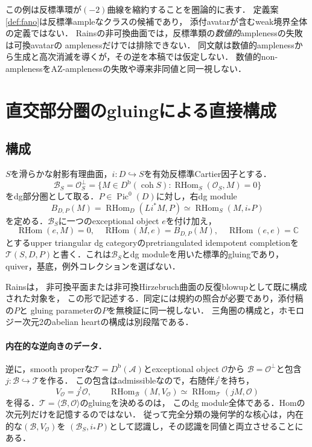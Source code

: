 \documentclass[11pt,a4paper]{ltjsarticle}
\theoremstyle{definition}
\newcommand{\OO}{\mathcal O}
\renewcommand{\AA}{\mathcal A}
\newcommand{\BB}{\mathcal B}
\newcommand{\TT}{\mathcal T}
\newcommand{\Db}{D^{\mathrm b}}
\newcommand{\RHom}{\operatorname{RHom}}
\newcommand{\coh}{\operatorname{coh}}
\newcommand{\Pic}{\operatorname{Pic}}
\begin{document}
この例は反標準環が$(-2)$曲線を縮約することを圏論的に表す．
定義案\ref{def:fano}は反標準ampleなクラスの候補であり，
添付avatarが含むweak境界全体の定義ではない．
Rainsの非可換曲面では，反標準類の\emph{数値的}amplenessの失敗は可換avatarの
amplenessだけでは排除できない\cite[\S4]{RainsFiltered}．
同文献は数値的amplenessから生成と高次消滅を導くが，その逆を本稿では仮定しない．
数値的non-amplenessをAZ-amplenessの失敗や導来非同値と同一視しない．

\section{直交部分圏のgluingによる直接構成}
\subsection{構成}
$S$を滑らかな射影有理曲面，$i:D\hookrightarrow S$を有効反標準Cartier因子とする．
\begin{equation}\label{eq:residual}
 \BB_S=\OO_S^\perp
 =\{M\in\Db(\coh S):\RHom_S(\OO_S,M)=0\}
\end{equation}
をdg部分圏として取る．$P\in\Pic^0(D)$に対し，右dg module
\begin{equation}\label{eq:glue-module}
 B_{D,P}(M)=\RHom_D(Li^*M,P)
 \simeq\RHom_S(M,i_*P)
\end{equation}
を定める．$\BB_S$に一つのexceptional object $e$を付け加え，
\begin{equation}\label{eq:glue-category}
 \RHom(e,M)=0,\quad
 \RHom(M,e)=B_{D,P}(M),\quad
 \RHom(e,e)=\mathbb C
\end{equation}
とするupper triangular dg categoryのpretriangulated idempotent completionを
$\TT(S,D,P)$と書く．これは$\BB_S$とdg moduleを用いた標準的gluingであり，
quiver，基底，例外コレクションを選ばない．

Rains\cite[Theorem 4.30]{RainsBirational}は，
非可換平面または非可換Hirzebruch曲面の反復blowupとして既に構成された対象を，
この形で記述する．同定には規約の照合が必要であり，添付稿の$P$と
gluing parameterの$P$を無検証に同一視しない．
三角圏の構成と，ホモロジー次元2のabelian heartの構成は別段階である．

\paragraph{内在的な逆向きのデータ．}
逆に，smooth properな$\TT=\Db(\AA)$とexceptional object $\OO$から
$\BB=\OO^\perp$と包含$j:\BB\hookrightarrow\TT$を作る．
この包含はadmissibleなので，右随伴$j^!$を持ち，
\begin{equation}\label{eq:intrinsic-gluing-object}
 V_{\OO}=j^!\OO,\qquad
 \RHom_{\BB}(M,V_{\OO})\simeq\RHom_{\TT}(jM,\OO)
\end{equation}
を得る．$\TT=\langle\BB,\OO\rangle$のgluingを決めるのは，
このdg module全体である．Homの次元列だけを記憶するのではない．
従って完全分類の幾何学的な核心は，内在的な$(\BB,V_{\OO})$を
$(\BB_S,i_*P)$として認識し，その認識を同値と両立させることにある．
\end{document}
